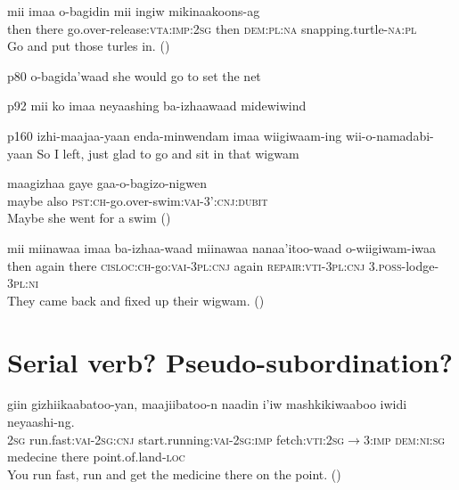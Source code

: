 \documentclass[oldfontcommands,oneside,a4paper,11pt]{article}
\begin{document}
\begin{exe}
\ex 
\gll
mii imaa o-bagidin mii ingiw mikinaakoons-ag \\
then there go.over-release:\textsc{vta}:\textsc{imp:2sg} then \textsc{dem:pl:na} snapping.turtle-\textsc{na:pl} \\
\glt Go and put those turles in. (\citealt[51]{kegg93portage})
\end{exe}
p80 o-bagida'waad she would go to set the net

p92 mii ko imaa neyaashing ba-izhaawaad midewiwind

p160 
izhi-maajaa-yaan enda-minwendam imaa wiigiwaam-ing wii-o-namadabi-yaan
So I left, just glad to go and sit in that wigwam

\begin{exe}
\ex 
\gll
maagizhaa gaye gaa-o-bagizo-nigwen \\
maybe also \textsc{pst:ch}-go.over-swim:\textsc{vai}-\textsc{3':cnj:dubit} \\
\glt Maybe she went for a swim (\citealt[74]{kegg93portage})
\end{exe}
\begin{exe}
\ex 
\gll
mii miinawaa imaa ba-izhaa-waad miinawaa nanaa'itoo-waad o-wiigiwam-iwaa \\
then again there \textsc{cisloc:ch}-go:\textsc{vai}-\textsc{3pl:cnj} again \textsc{repair:vti}-\textsc{3pl:cnj} \textsc{3.poss}-lodge-\textsc{3pl:ni} \\
\glt They came back and fixed up their wigwam. (\citealt[32]{kegg93portage})
\end{exe}


\section{Serial verb? Pseudo-subordination?}
\begin{exe}
\ex 
\gll giin  gizhiikaabatoo-yan, maajiibatoo-n naadin i'iw mashkikiwaaboo iwidi neyaashi-ng. \\
 \textsc{2sg} run.fast:\textsc{vai}-\textsc{2sg:cnj} start.running:\textsc{vai}-\textsc{2sg:imp} fetch:\textsc{vti}:\textsc{2sg$\rightarrow$3:imp} \textsc{dem:ni:sg} medecine there point.of.land-\textsc{loc} \\
\glt You run fast, run and get the medicine there on the point. (\citealt[96]{kegg93portage})
\end{exe}




 
\end{document}
